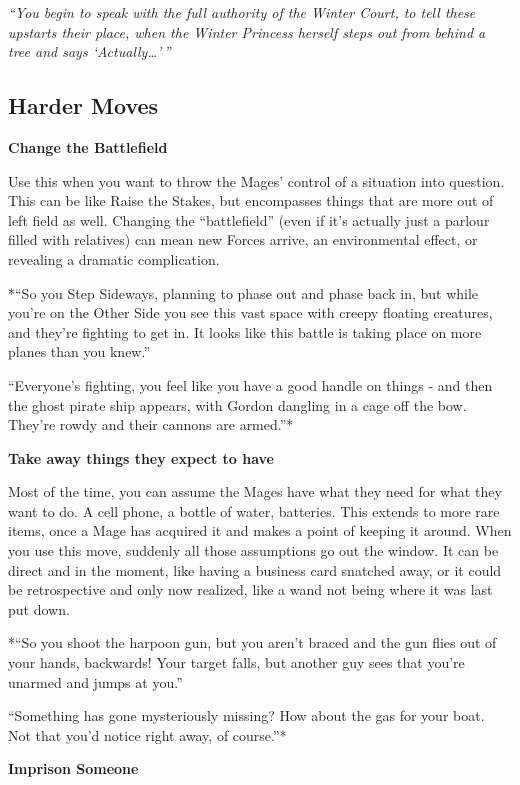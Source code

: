 \documentclass[
]{memoir}
\begin{document}
\emph{``You begin to speak with the full authority of the Winter Court,
to tell these upstarts their place, when the Winter Princess herself
steps out from behind a tree and says `Actually\ldots{}'\,''}

\hypertarget{harder-moves}{%
\subsection{Harder Moves}\label{harder-moves}}

\textbf{Change the Battlefield}

Use this when you want to throw the Mages' control of a situation into
question. This can be like Raise the Stakes, but encompasses things that
are more out of left field as well. Changing the ``battlefield'' (even
if it's actually just a parlour filled with relatives) can mean new
Forces arrive, an environmental effect, or revealing a dramatic
complication.

*``So you Step Sideways, planning to phase out and phase back in, but
while you're on the Other Side you see this vast space with creepy
floating creatures, and they're fighting to get in. It looks like this
battle is taking place on more planes than you knew.''

``Everyone's fighting, you feel like you have a good handle on things -
and then the ghost pirate ship appears, with Gordon dangling in a cage
off the bow. They're rowdy and their cannons are armed.''*

\textbf{Take away things they expect to have}

Most of the time, you can assume the Mages have what they need for what
they want to do. A cell phone, a bottle of water, batteries. This
extends to more rare items, once a Mage has acquired it and makes a
point of keeping it around. When you use this move, suddenly all those
assumptions go out the window. It can be direct and in the moment, like
having a business card snatched away, or it could be retrospective and
only now realized, like a wand not being where it was last put down.

*``So you shoot the harpoon gun, but you aren't braced and the gun flies
out of your hands, backwards! Your target falls, but another guy sees
that you're unarmed and jumps at you.''

``Something has gone mysteriously missing? How about the gas for your
boat. Not that you'd notice right away, of course.''*

\textbf{Imprison Someone}
\end{document}
